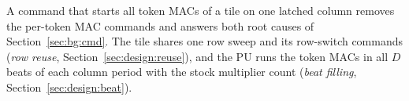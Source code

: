 A command that starts all token MACs of a tile on one latched column removes the per-token MAC commands and answers
both root causes of Section~\ref{sec:bg:cmd}. The tile shares one row sweep and its row-switch commands (\emph{row
reuse}, Section~\ref{sec:design:reuse}), and the PU runs the token MACs in all $D$ beats of each column period with the
stock multiplier count (\emph{beat filling}, Section~\ref{sec:design:beat}).
